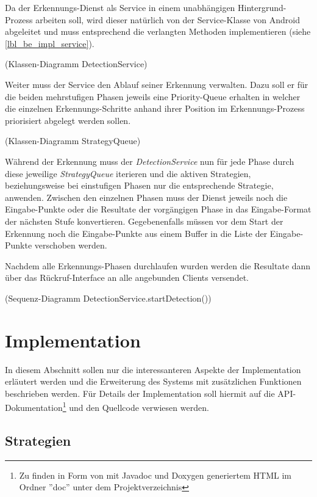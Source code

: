 Da der Erkennungs-Dienst als Service in einem unabhängigen Hintergrund-Prozess arbeiten soll, wird dieser natürlich von der Service-Klasse von Android abgeleitet und muss entsprechend die verlangten Methoden implementieren (siehe \ref{lbl_be_impl_service}).

(Klassen-Diagramm DetectionService)

Weiter muss der Service den Ablauf seiner Erkennung verwalten. Dazu soll er für die beiden mehrstufigen Phasen jeweils eine Priority-Queue erhalten in welcher die einzelnen Erkennungs-Schritte anhand ihrer Position im Erkennungs-Prozess priorisiert abgelegt werden sollen.

(Klassen-Diagramm StrategyQueue)

Während der Erkennung muss der \emph{DetectionService} nun für jede Phase durch diese jeweilige \emph{StrategyQueue} iterieren und die aktiven Strategien, beziehungsweise bei einstufigen Phasen nur die entsprechende Strategie, anwenden. Zwischen den einzelnen Phasen muss der Dienst jeweils noch die Eingabe-Punkte oder die Resultate der vorgängigen Phase in das Eingabe-Format der nächsten Stufe konvertieren. Gegebenenfalls müssen vor dem Start der Erkennung noch die Eingabe-Punkte aus einem Buffer in die Liste der Eingabe-Punkte verschoben werden.

Nachdem alle Erkennungs-Phasen durchlaufen wurden werden die Resultate dann über das Rückruf-Interface an alle angebunden Clients versendet.

(Sequenz-Diagramm DetectionService.startDetection())


\section{Implementation}

In diesem Abschnitt sollen nur die interessanteren Aspekte der Implementation erläutert werden und die Erweiterung des Systems mit zusätzlichen Funktionen beschrieben werden. Für Details der Implementation soll hiermit auf die API-Dokumentation\footnote{Zu finden in Form von mit Javadoc und Doxygen generiertem HTML im Ordner ''doc'' unter dem Projektverzeichnis} und den Quellcode verwiesen werden.

\subsection{Strategien}

